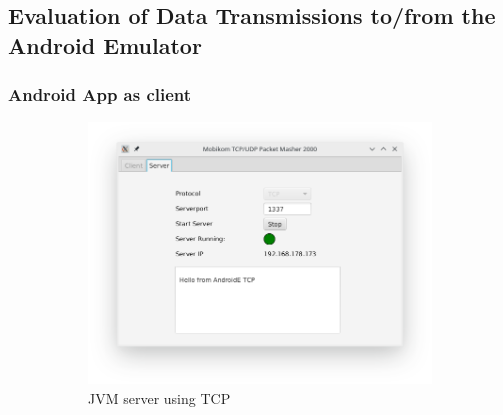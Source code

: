 \subsection{Evaluation of Data Transmissions to/from the Android Emulator}
\subsubsection{Android App as client}
\begin{figure}[H]
	\centering
	\begin{subfigure}{.49\textwidth}
		\centering
		\includegraphics[width=1\linewidth]{images/task3/subtask1/jvmservertcp.png}
		\caption{JVM server using TCP}
		\end{subfigure}
	\begin{subfigure}{.49\textwidth}
		\centering

\end{subfigure}
\end{figure}

